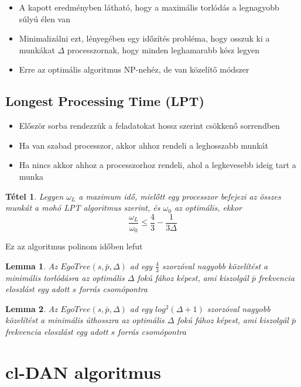 \documentclass[12pt]{report}
\newtheorem{mytetel}{Tétel}
\newtheorem{mylemma}{Lemma}
\begin{document}
\begin{itemize}
	\item A kapott eredményben látható, hogy a maximális torlódás a legnagyobb súlyú élen van
	\item Minimalizálni ezt, lényegében egy időzítés probléma, hogy osszuk ki a munkákat \(\Delta\) processzornak, hogy minden leghamarabb kész legyen
	\item Erre az optimális algoritmus NP-nehéz, de van közelítő módszer
\end{itemize}

\subsection{Longest Processing Time (LPT)}

\begin{itemize}
	\item Először sorba rendezzük a feladatokat hossz szerint csökkenő sorrendben
	\item Ha van szabad processzor, akkor ahhoz rendeli a leghosszabb munkát
	\item Ha nincs akkor ahhoz a processzorhoz rendeli, ahol a legkevesebb ideig tart a munka
\end{itemize}
\begin{mytetel}
	Legyen \(\omega_L\) a maximum idő, mielőtt egy processzor befejezi az összes munkát a mohó LPT algoritmus szerint, és \(\omega_0\) az optimális, ekkor \[\frac{\omega_L}{\omega_0} \le \frac{4}{3} - \frac{1}{3\Delta}\]
\end{mytetel}

Ez az algoritmus polinom időben lefut

\begin{mylemma}
	Az \(EgoTree(s, \bar{p}, \Delta)\) ad egy \(\frac{4}{3}\) szorzóval nagyobb közelítést a minimális torlódásra az optimális \(\Delta\) fokú fához képest, ami kiszolgál \(\bar{p}\) frekvencia eloszlást egy adott \(s\) forrás csomópontra
\end{mylemma}

\begin{mylemma}
	Az \(EgoTree(s, \bar{p}, \Delta)\) ad egy \(log^2(\Delta + 1)\) szorzóval nagyobb közelítést a minimális úthosszra az optimális \(\Delta\) fokú fához képest, ami kiszolgál \(\bar{p}\) frekvencia eloszlást egy adott \(s\) forrás csomópontra
\end{mylemma}

\section{cl-DAN algoritmus}
\end{document}
